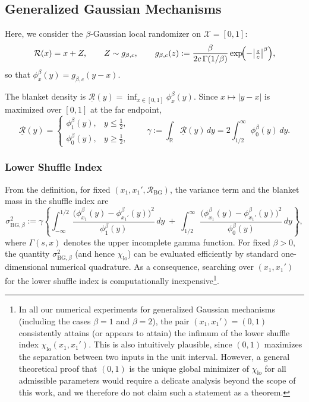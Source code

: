\documentclass{article}
\theoremstyle{plain}
\theoremstyle{definition}
\begin{document}
\subsection{Generalized Gaussian Mechanisms}

Here, we consider the $\beta$-Gaussian local randomizer on $\mathcal X=[0,1]$:
\[
\mathcal R(x)=x+Z,\qquad
Z\sim g_{\beta,c},\qquad
g_{\beta,c}(z):=\frac{\beta}{2c\,\Gamma(1/\beta)}\exp\!\Bigl(-\bigl|\tfrac{z}{c}\bigr|^\beta\Bigr),
\]
so that $\phi_x^\beta(y)=g_{\beta,c}(y-x)$.

The blanket density is $\underline{\mathcal R}(y)=\inf_{x\in[0,1]}\phi_x^\beta(y)$.
Since $x\mapsto |y-x|$ is maximized over $[0,1]$ at the far endpoint,
\begin{equation}
\label{eq:underlineR}
\underline{\mathcal R}(y)
=
\begin{cases}
\phi_1^\beta(y), & y\le \tfrac12,\\[2pt]
\phi_0^\beta(y), & y\ge \tfrac12,
\end{cases}
\qquad
\gamma:=\int_\mathbb R \underline{\mathcal R}(y)\,dy
=
2\int_{1/2}^{\infty}\phi_0^\beta(y)\,dy.
\end{equation}

\subsubsection{Lower Shuffle Index}
From the definition, for fixed $(x_1,x_1', \mathcal{R}_{\mathrm{BG}})$, the variance term and the blanket mass in the shuffle index are
\[
  \sigma_{\mathrm{BG},\beta}^2
  :=
  \gamma
  \left\{
    \int_{-\infty}^{1/2}
      \frac{\bigl(\phi_{x_1}^{\beta}(y)-\phi_{x_1'}^{\beta}(y)\bigr)^2}
           {\phi_1^{\beta}(y)}\,dy
    \;+\;
    \int_{1/2}^{\infty}
      \frac{\bigl(\phi_{x_1}^{\beta}(y)-\phi_{x_1'}^{\beta}(y)\bigr)^2}
           {\phi_0^{\beta}(y)}\,dy
  \right\},
\]
where \(\Gamma(s,x)\) denotes the upper incomplete gamma function.
For fixed $\beta>0$, the quantity $\sigma_{\mathrm{BG},\beta}^2$ (and hence $\chi_{\mathrm{lo}}$) can be evaluated efficiently by standard one-dimensional numerical quadrature. 
As a consequence, searching over $(x_1,x_1')$ for the lower shuffle index is computationally inexpensive\footnote{In all our numerical experiments for generalized Gaussian
mechanisms (including the cases $\beta=1$ and $\beta=2$), the pair
$(x_1,x_1')=(0,1)$ consistently attains (or appears to attain) the infimum of the lower shuffle index $\chi_{\mathrm{lo}}(x_1,x_1')$. 
This is also intuitively plausible, since $(0,1)$ maximizes the separation between two inputs in the unit interval. However, a general theoretical proof that $(0,1)$ is the unique global minimizer of $\chi_{\mathrm{lo}}$ for all admissible parameters would require a delicate analysis beyond the scope of this work, and we therefore do not claim such a statement as a theorem.}. 
\end{document}
